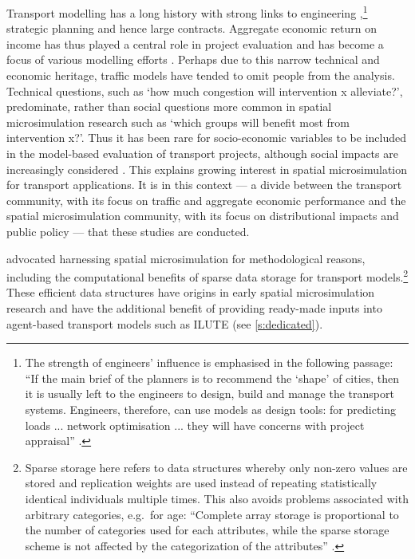 \documentclass[a4paper, 11pt, twoside]{Thesis}
\begin{document}
Transport modelling has a long history with strong links to engineering
,\footnote{The strength of engineers'
influence is emphasised in the following passage: ``If the main brief
of the planners is to recommend the `shape' of cities,
then it is usually left to the engineers to design, build and manage the
transport systems. Engineers,
therefore, can use models as design tools: for predicting loads ...
network optimisation ... they will have concerns with project
appraisal'' \citep[p.~16]{Wilson1998-past}.}
strategic planning \citep{Wilson1998-past} and hence large contracts.
Aggregate economic return on income has thus played a central role in
project evaluation and has become a focus of various modelling efforts
\citep{Masser1992}.
Perhaps due to this narrow technical and economic heritage, traffic models
have tended to omit people from the analysis. Technical
questions, such as `how much congestion will intervention x alleviate?',
predominate, rather
than social questions more common in spatial microsimulation research
such as `which groups will benefit most from intervention x?'.
Thus it has been rare for socio-economic variables to be included in
the model-based evaluation of transport projects, although
social impacts are increasingly considered \citep{Masser1992, Tribby2012}.
This explains growing interest
in spatial microsimulation for transport applications.
It is in this context --- a divide between the transport community, with its focus
on traffic and aggregate economic performance and the spatial microsimulation
community, with its focus on distributional impacts and public policy --- that these
studies are conducted. 


\citet{Pritchard2012} advocated harnessing spatial microsimulation
for methodological reasons, including the computational benefits of sparse data storage
for transport models.\footnote{Sparse storage here refers to data structures
whereby only non-zero values are stored and replication
weights are used instead of repeating statistically identical individuals multiple
times. This also avoids problems associated with arbitrary categories, e.g.~for
age: ``Complete array storage is proportional to the number of categories used
for each attributes, while the sparse storage scheme is not affected by the
categorization of the attributes'' \citep[p.~691]{Pritchard2012}.} These
efficient 
data structures have origins in early spatial microsimulation
research \citep{Holm1987, Williamson1998} and have the additional benefit
of providing ready-made inputs into agent-based transport models such as
ILUTE (see \cref{s:dedicated}).
\end{document}
